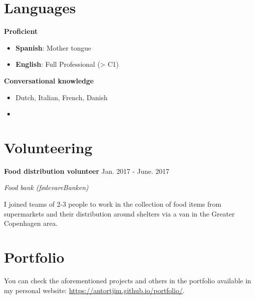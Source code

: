 \documentclass[paper=a4,fontsize=11pt]{article}
\newcommand{\NewPart}[1]{
\vspace{-15pt}
\section*{
{#1}}}
\newcommand{\Entry}[4]{
		\noindent \textbf{#1} \hfill      %
		{\color{gray}\textsf{#2}} \par                  %
		\noindent \textit{#3} \par        %
		  \noindent \small #4  %
		\normalsize \par \vspace{7.5pt}}
\begin{document}


\NewPart{Languages}



\begin{minipage}[l]{0.35\textwidth}
    \textbf{Proficient}
  \begin{itemize}[leftmargin=5pt]
    \setlength\itemsep{0.05pt}
    \item[] \textbf{Spanish}: Mother tongue
    \item[] \textbf{English}: Full Professional (> C1)
  \end{itemize}
\end{minipage} %
\begin{minipage}[r]{0.65\textwidth}
  \textbf{Conversational knowledge}
  \begin{itemize}[leftmargin=5pt]
    \setlength\itemsep{0.05pt}
    \item[] Dutch, Italian, French, Danish
    \item[] 
  \end{itemize}
\end{minipage}

\vspace{0.5cm}




\NewPart{Volunteering}

\Entry{Food distribution volunteer}{Jan. 2017 - June. 2017}{Food bank (f{\o}devareBanken)}{I joined teams of 2-3 people to work in the collection of food items from supermarkets and their distribution around shelters via a van in the Greater Copenhagen area.}



%

\NewPart{Portfolio}

You can check the aforementioned projects and others in the portfolio available in my personal website:
\href{https://antortjim.github.io/portfolio/}{\color{blue}https://antortjim.github.io/portfolio/}.
\end{document}
